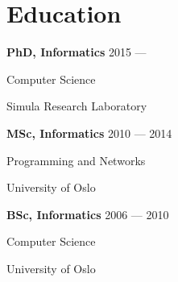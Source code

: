 \section{Education}
\parbox[t][][t]{\linewidth}{
	\parbox{\linewidth}{\textbf{PhD, Informatics} \hfill {{2015 --- \phantom{2018}}}}
	\parbox{\linewidth}{{Computer Science}}
	\parbox{\linewidth}{{Simula Research Laboratory}}
	\smallskip
}

\parbox[t][][t]{\linewidth}{
	\parbox{\linewidth}{\textbf{MSc, Informatics} \hfill {{2010 --- 2014}}}
	\parbox{\linewidth}{{Programming and Networks}}
	\parbox{\linewidth}{{University of Oslo}}
	\smallskip
}

\parbox[t][][t]{\linewidth}{
	\parbox{\linewidth}{\textbf{BSc, Informatics} \hfill {{2006 --- 2010}}}
	\parbox{\linewidth}{{Computer Science}}
	\parbox{\linewidth}{{University of Oslo}}
	\smallskip
}


